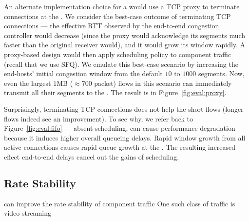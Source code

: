 

 An alternate implementation choice for a \name would use a TCP proxy to terminate connections at the \inbox.
We consider the best-case outcome of terminating TCP connections --- the effective RTT observed by the end-to-end congestion controller would decrease (since the proxy would acknowledge its segments much faster than the original receiver would), and it would grow its window rapidly.
A proxy-based design would then apply scheduling policy to component traffic (recall that we use SFQ).
We emulate this best-case scenario by increasing the end-hosts' initial congestion window from the default $10$ to $1000$ segments.
Now, even the largest $1$MB ($\approx700$ packet) flows in this scenario can immediately transmit all their segments to the \inbox.
The result is in Figure~\ref{fig:eval:proxy}.



Surprisingly, terminating TCP connections does not help the short flows (longer flows indeed see an improvement). 
To see why, we refer back to Figure~\ref{fig:eval:fifo} --- absent scheduling, \name can cause performance degradation because it induces higher overall queueing delays.
Rapid window growth from all active connections causes rapid queue growth at the \inbox. The resulting increased effect end-to-end delays cancel out the gains of scheduling.

\subsection{Rate Stability}\label{s:eval:ratestable}

\begin{outline}
    \1 \name can improve the rate stability of component traffic
    \1 One such class of traffic is video streaming
\end{outline}

